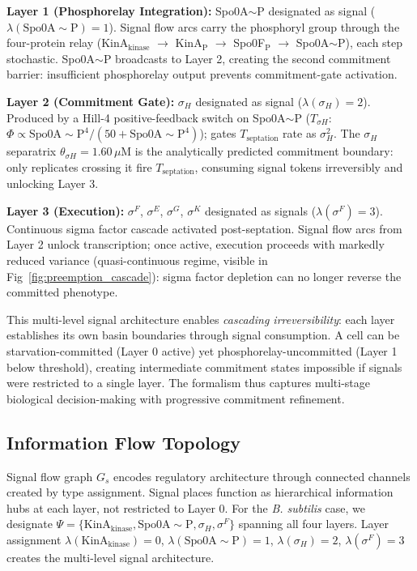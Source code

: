 \documentclass[10pt,letterpaper]{article}
\begin{document}
\vspace{3pt}
\noindent\textbf{Layer 1 (Phosphorelay Integration):} Spo0A$\sim$P designated as signal ($\lambda(\text{Spo0A}{\sim}\text{P}) = 1$). Signal flow arcs carry the phosphoryl group through the four-protein relay (KinA$_{\text{kinase}}$ $\to$ KinA$_{\text{P}}$ $\to$ Spo0F$_{\text{P}}$ $\to$ Spo0A$\sim$P), each step stochastic. Spo0A$\sim$P broadcasts to Layer 2, creating the second commitment barrier: insufficient phosphorelay output prevents commitment-gate activation.

\vspace{3pt}
\noindent\textbf{Layer 2 (Commitment Gate):} $\sigma_H$ designated as signal ($\lambda(\sigma_H) = 2$). Produced by a Hill-4 positive-feedback switch on Spo0A$\sim$P ($T_{\sigma H}$: $\Phi \propto \text{Spo0A}{\sim}\text{P}^4 / (50 + \text{Spo0A}{\sim}\text{P}^4)$); gates $T_{\text{septation}}$ rate as $\sigma_H^2$. The $\sigma_H$ separatrix $\theta_{\sigma H} = 1.60\,\mu$M is the analytically predicted commitment boundary: only replicates crossing it fire $T_{\text{septation}}$, consuming signal tokens irreversibly and unlocking Layer 3.

\vspace{3pt}
\noindent\textbf{Layer 3 (Execution):} $\sigma^F$, $\sigma^E$, $\sigma^G$, $\sigma^K$ designated as signals ($\lambda(\sigma^F) = 3$). Continuous sigma factor cascade activated post-septation. Signal flow arcs from Layer 2 unlock transcription; once active, execution proceeds with markedly reduced variance (quasi-continuous regime, visible in Fig~\ref{fig:preemption_cascade}): sigma factor depletion can no longer reverse the committed phenotype.

\vspace{3pt}
\noindent This multi-level signal architecture enables \textit{cascading irreversibility}: each layer establishes its own basin boundaries through signal consumption. A cell can be starvation-committed (Layer 0 active) yet phosphorelay-uncommitted (Layer 1 below threshold), creating intermediate commitment states impossible if signals were restricted to a single layer. The formalism thus captures multi-stage biological decision-making with progressive commitment refinement.

\subsection{Information Flow Topology}

Signal flow graph $G_s$ encodes regulatory architecture through connected channels created by type assignment. Signal places function as hierarchical information hubs at each layer, not restricted to Layer 0. For the \textit{B. subtilis} case, we designate $\Psi = \{\text{KinA}_{\text{kinase}}, \text{Spo0A}{\sim}\text{P}, \sigma_H, \sigma^F\}$ spanning all four layers. Layer assignment $\lambda(\text{KinA}_{\text{kinase}}) = 0$, $\lambda(\text{Spo0A}{\sim}\text{P}) = 1$, $\lambda(\sigma_H) = 2$, $\lambda(\sigma^F) = 3$ creates the multi-level signal architecture.
\end{document}
